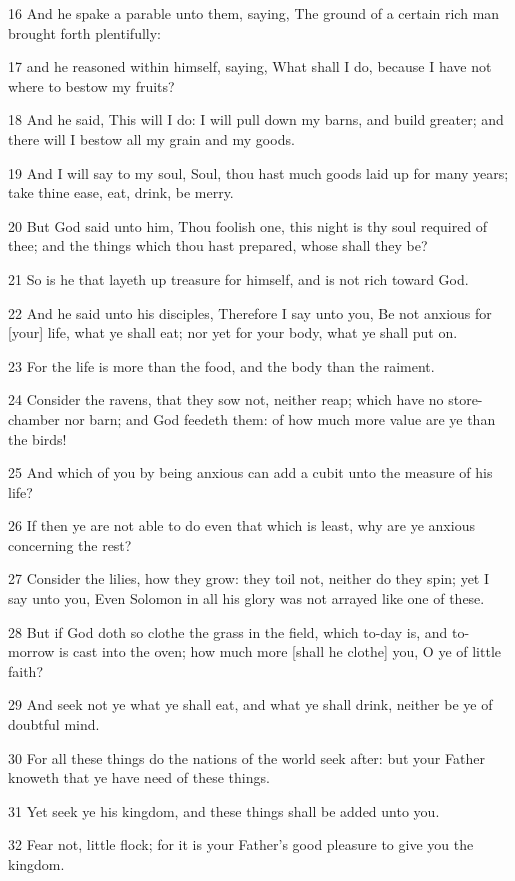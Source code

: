 \par 16 And he spake a parable unto them, saying, The ground of a certain rich man brought forth plentifully:
\par 17 and he reasoned within himself, saying, What shall I do, because I have not where to bestow my fruits?
\par 18 And he said, This will I do: I will pull down my barns, and build greater; and there will I bestow all my grain and my goods.
\par 19 And I will say to my soul, Soul, thou hast much goods laid up for many years; take thine ease, eat, drink, be merry.
\par 20 But God said unto him, Thou foolish one, this night is thy soul required of thee; and the things which thou hast prepared, whose shall they be?
\par 21 So is he that layeth up treasure for himself, and is not rich toward God.
\par 22 And he said unto his disciples, Therefore I say unto you, Be not anxious for [your] life, what ye shall eat; nor yet for your body, what ye shall put on.
\par 23 For the life is more than the food, and the body than the raiment.
\par 24 Consider the ravens, that they sow not, neither reap; which have no store-chamber nor barn; and God feedeth them: of how much more value are ye than the birds!
\par 25 And which of you by being anxious can add a cubit unto the measure of his life?
\par 26 If then ye are not able to do even that which is least, why are ye anxious concerning the rest?
\par 27 Consider the lilies, how they grow: they toil not, neither do they spin; yet I say unto you, Even Solomon in all his glory was not arrayed like one of these.
\par 28 But if God doth so clothe the grass in the field, which to-day is, and to-morrow is cast into the oven; how much more [shall he clothe] you, O ye of little faith?
\par 29 And seek not ye what ye shall eat, and what ye shall drink, neither be ye of doubtful mind.
\par 30 For all these things do the nations of the world seek after: but your Father knoweth that ye have need of these things.
\par 31 Yet seek ye his kingdom, and these things shall be added unto you.
\par 32 Fear not, little flock; for it is your Father's good pleasure to give you the kingdom.
